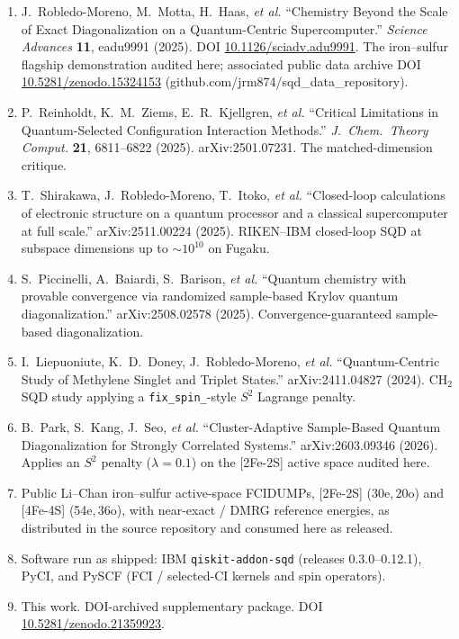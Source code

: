 \documentclass[11pt]{article}
\begin{document}
\begin{enumerate}
\item J.~Robledo-Moreno, M.~Motta, H.~Haas, \emph{et al.} ``Chemistry Beyond the Scale of Exact Diagonalization on a Quantum-Centric Supercomputer.'' \emph{Science Advances} \textbf{11}, eadu9991 (2025). DOI \href{https://doi.org/10.1126/sciadv.adu9991}{10.1126/sciadv.adu9991}. The iron--sulfur flagship demonstration audited here; associated public data archive DOI \href{https://doi.org/10.5281/zenodo.15324153}{10.5281/zenodo.15324153} (github.com/jrm874/sqd\_data\_repository).
\item P.~Reinholdt, K.~M.~Ziems, E.~R.~Kjellgren, \emph{et al.} ``Critical Limitations in Quantum-Selected Configuration Interaction Methods.'' \emph{J.\ Chem.\ Theory Comput.} \textbf{21}, 6811--6822 (2025). arXiv:2501.07231. The matched-dimension critique.
\item T.~Shirakawa, J.~Robledo-Moreno, T.~Itoko, \emph{et al.} ``Closed-loop calculations of electronic structure on a quantum processor and a classical supercomputer at full scale.'' arXiv:2511.00224 (2025). RIKEN--IBM closed-loop SQD at subspace dimensions up to ${\sim}10^{10}$ on Fugaku.
\item S.~Piccinelli, A.~Baiardi, S.~Barison, \emph{et al.} ``Quantum chemistry with provable convergence via randomized sample-based Krylov quantum diagonalization.'' arXiv:2508.02578 (2025). Convergence-guaranteed sample-based diagonalization.
\item I.~Liepuoniute, K.~D.~Doney, J.~Robledo-Moreno, \emph{et al.} ``Quantum-Centric Study of Methylene Singlet and Triplet States.'' arXiv:2411.04827 (2024). CH$_2$ SQD study applying a \texttt{fix\_spin\_}-style $S^2$ Lagrange penalty.
\item B.~Park, S.~Kang, J.~Seo, \emph{et al.} ``Cluster-Adaptive Sample-Based Quantum Diagonalization for Strongly Correlated Systems.'' arXiv:2603.09346 (2026). Applies an $S^2$ penalty ($\lambda = 0.1$) on the [2Fe-2S] active space audited here.
\item Public Li--Chan iron--sulfur active-space FCIDUMPs, [2Fe-2S] (30e,\,20o) and [4Fe-4S] (54e,\,36o), with near-exact / DMRG reference energies, as distributed in the source repository and consumed here as released.
\item Software run as shipped: IBM \texttt{qiskit-addon-sqd} (releases 0.3.0--0.12.1), PyCI, and PySCF (FCI / selected-CI kernels and spin operators).
\item This work. DOI-archived supplementary package. DOI \href{https://doi.org/10.5281/zenodo.21359923}{10.5281/zenodo.21359923}.
\end{enumerate}
\end{document}
